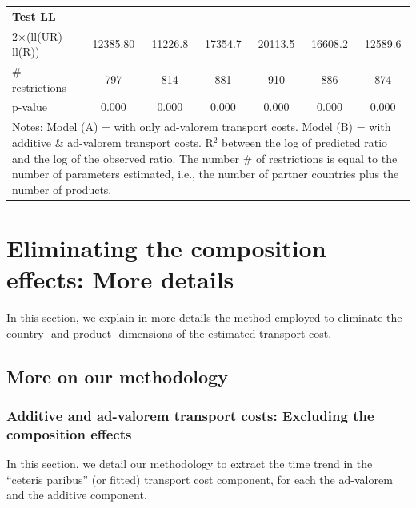 \documentclass[a4paper,11pt]{article}
\begin{document}
\begin{table}[htbp]
\begin{center}
{\begin{tabular}{l|cccccc}
\textbf{Test LL} &       &       & & &  & \\
2$\times$(ll(UR) -ll(R)) & 12385.80 & 11226.8 & \multicolumn{1}{c}{17354.7} & \multicolumn{1}{c}{20113.5} & \multicolumn{1}{c}{16608.2} & \multicolumn{1}{c}{12589.6} \\
\# restrictions  & 797   & 814   & \multicolumn{1}{c}{881} & \multicolumn{1}{c}{910} & \multicolumn{1}{c}{886} & \multicolumn{1}{c}{874} \\
p-value & 0.000 & 0.000 & \multicolumn{1}{c}{0.000} & \multicolumn{1}{c}{0.000} & \multicolumn{1}{c}{0.000} & \multicolumn{1}{c}{0.000} \\
\hline\hline
\multicolumn{7}{l}{\parbox[l]{13cm}{ \vspace{7pt}\scriptsize{Notes: Model (A) = with only ad-valorem transport costs. Model (B) = with additive \& ad-valorem
transport costs. R$^{2}$ between the log of predicted ratio and the log of the observed ratio. The number \# of restrictions is equal to the number of parameters estimated, i.e., the number of partner countries plus the number of products.}}}
\end{tabular}%
}
\end{center}
\end{table}%

\newpage


\clearpage
\setcounter{table}{0}
\setcounter{figure}{0}
\renewcommand{\thefigure}{D.\arabic{figure}}
\renewcommand{\thetable}{D.\arabic{table}}

\section{Eliminating the composition effects: More details \label{app:comp-effects}}

In this section, we explain in more details the method employed to eliminate the country- and product- dimensions of the estimated transport cost.

\subsection{More on our methodology}


\subsubsection{Additive and ad-valorem transport costs: Excluding the composition effects}

In this section, we detail our methodology to extract the time trend in the ``ceteris paribus'' (or fitted) transport cost component, for each the ad-valorem and the additive component.
\end{document}
